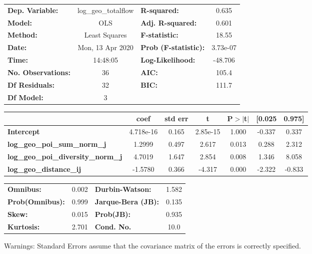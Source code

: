\begin{center}
\begin{tabular}{lclc}
\toprule
\textbf{Dep. Variable:}                    & log\_geo\_totalflow & \textbf{  R-squared:         } &     0.635   \\
\textbf{Model:}                            &         OLS         & \textbf{  Adj. R-squared:    } &     0.601   \\
\textbf{Method:}                           &    Least Squares    & \textbf{  F-statistic:       } &     18.55   \\
\textbf{Date:}                             &   Mon, 13 Apr 2020  & \textbf{  Prob (F-statistic):} &  3.73e-07   \\
\textbf{Time:}                             &       14:48:05      & \textbf{  Log-Likelihood:    } &   -48.706   \\
\textbf{No. Observations:}                 &            36       & \textbf{  AIC:               } &     105.4   \\
\textbf{Df Residuals:}                     &            32       & \textbf{  BIC:               } &     111.7   \\
\textbf{Df Model:}                         &             3       & \textbf{                     } &             \\
\bottomrule
\end{tabular}
\begin{tabular}{lcccccc}
                                           & \textbf{coef} & \textbf{std err} & \textbf{t} & \textbf{P$> |$t$|$} & \textbf{[0.025} & \textbf{0.975]}  \\
\midrule
\textbf{Intercept}                         &    4.718e-16  &        0.165     &  2.85e-15  &         1.000        &       -0.337    &        0.337     \\
\textbf{log\_geo\_poi\_sum\_norm\_j}       &       1.2999  &        0.497     &     2.617  &         0.013        &        0.288    &        2.312     \\
\textbf{log\_geo\_poi\_diversity\_norm\_j} &       4.7019  &        1.647     &     2.854  &         0.008        &        1.346    &        8.058     \\
\textbf{log\_geo\_distance\_ij}            &      -1.5780  &        0.366     &    -4.317  &         0.000        &       -2.322    &       -0.833     \\
\bottomrule
\end{tabular}
\begin{tabular}{lclc}
\textbf{Omnibus:}       &  0.002 & \textbf{  Durbin-Watson:     } &    1.582  \\
\textbf{Prob(Omnibus):} &  0.999 & \textbf{  Jarque-Bera (JB):  } &    0.135  \\
\textbf{Skew:}          &  0.015 & \textbf{  Prob(JB):          } &    0.935  \\
\textbf{Kurtosis:}      &  2.701 & \textbf{  Cond. No.          } &     10.0  \\
\bottomrule
\end{tabular}
\end{center}

Warnings: \newline
 [1] Standard Errors assume that the covariance matrix of the errors is correctly specified.